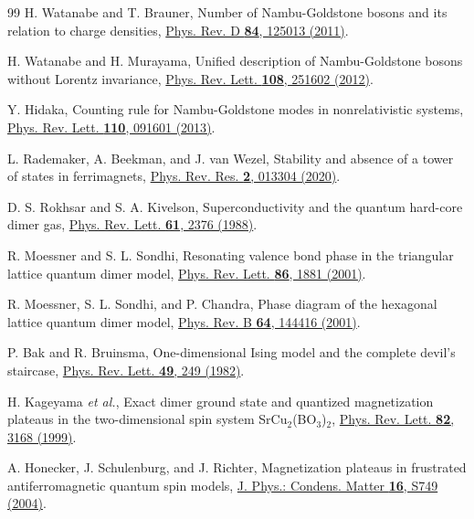 \documentclass[prb,twocolumn,amsmath,amssymb,floatfix]{revtex4-2}
\begin{document}
\begin{thebibliography}{99}
 H. Watanabe and T. Brauner, Number of Nambu-Goldstone bosons and its relation to charge densities, \href{https://doi.org/10.1103/PhysRevD.84.125013}{Phys. Rev. D \textbf{84}, 125013 (2011)}.

 H. Watanabe and H. Murayama, Unified description of Nambu-Goldstone bosons without Lorentz invariance, \href{https://doi.org/10.1103/PhysRevLett.108.251602}{Phys. Rev. Lett. \textbf{108}, 251602 (2012)}.

 Y. Hidaka, Counting rule for Nambu-Goldstone modes in nonrelativistic systems, \href{https://doi.org/10.1103/PhysRevLett.110.091601}{Phys. Rev. Lett. \textbf{110}, 091601 (2013)}.

 L. Rademaker, A. Beekman, and J. van Wezel, Stability and absence of a tower of states in ferrimagnets, \href{https://doi.org/10.1103/PhysRevResearch.2.013304}{Phys. Rev. Res. \textbf{2}, 013304 (2020)}.

 D. S. Rokhsar and S. A. Kivelson, Superconductivity and the quantum hard-core dimer gas, \href{https://doi.org/10.1103/PhysRevLett.61.2376}{Phys. Rev. Lett. \textbf{61}, 2376 (1988)}.

 R. Moessner and S. L. Sondhi, Resonating valence bond phase in the triangular lattice quantum dimer model, \href{https://doi.org/10.1103/PhysRevLett.86.1881}{Phys. Rev. Lett. \textbf{86}, 1881 (2001)}.

 R. Moessner, S. L. Sondhi, and P. Chandra, Phase diagram of the hexagonal lattice quantum dimer model, \href{https://doi.org/10.1103/PhysRevB.64.144416}{Phys. Rev. B \textbf{64}, 144416 (2001)}.

 P. Bak and R. Bruinsma, One-dimensional Ising model and the complete devil's staircase, \href{https://doi.org/10.1103/PhysRevLett.49.249}{Phys. Rev. Lett. \textbf{49}, 249 (1982)}.

 H. Kageyama \textit{et al.}, Exact dimer ground state and quantized magnetization plateaus in the two-dimensional spin system SrCu$_2$(BO$_3$)$_2$, \href{https://doi.org/10.1103/PhysRevLett.82.3168}{Phys. Rev. Lett. \textbf{82}, 3168 (1999)}.

 A. Honecker, J. Schulenburg, and J. Richter, Magnetization plateaus in frustrated antiferromagnetic quantum spin models, \href{https://doi.org/10.1088/0953-8984/16/11/025}{J. Phys.: Condens. Matter \textbf{16}, S749 (2004)}.


\end{thebibliography}
\end{document}
